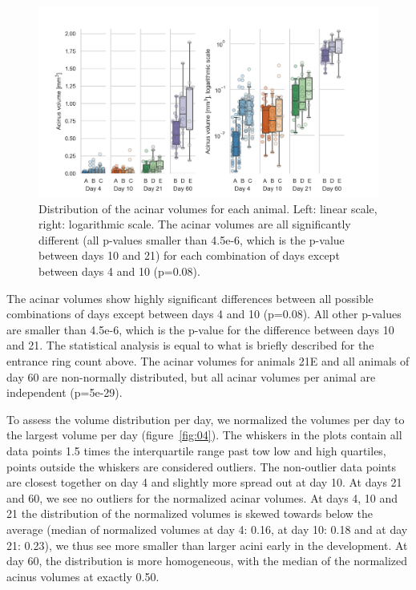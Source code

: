 \documentclass[
  american,
]{article}
\begin{document}
\begin{figure}
\hypertarget{fig:03}{%
\centering
\includegraphics{images/fig03.png}
\caption{Distribution of the acinar volumes for each animal.
Left: linear scale, right: logarithmic scale.
The acinar volumes are all significantly different (all p-values smaller than 4.5e-6, which is the p-value between days 10 and 21) for each combination of days except between days 4 and 10 (p=0.08).}\label{fig:03}
}
\end{figure}

The acinar volumes show highly significant differences between all possible combinations of days except between days 4 and 10 (p=0.08).
All other p-values are smaller than 4.5e-6, which is the p-value for the difference between days 10 and 21.
The statistical analysis is equal to what is briefly described for the entrance ring count above.
The acinar volumes for animals 21E and all animals of day 60 are non-normally distributed, but all acinar volumes per animal are independent (p=5e-29).

To assess the volume distribution per day, we normalized the volumes per day to the largest volume per day (figure~\ref{fig:04}).
The whiskers in the plots contain all data points 1.5 times the interquartile range past tow low and high quartiles, points outside the whiskers are considered outliers.
The non-outlier data points are closest together on day 4 and slightly more spread out at day 10.
At days 21 and 60, we see no outliers for the normalized acinar volumes.
At days 4, 10 and 21 the distribution of the normalized volumes is skewed towards below the average (median of normalized volumes at day 4: 0.16, at day 10: 0.18 and at day 21: 0.23), we thus see more smaller than larger acini early in the development.
At day 60, the distribution is more homogeneous, with the median of the normalized acinus volumes at exactly 0.50.
\end{document}
